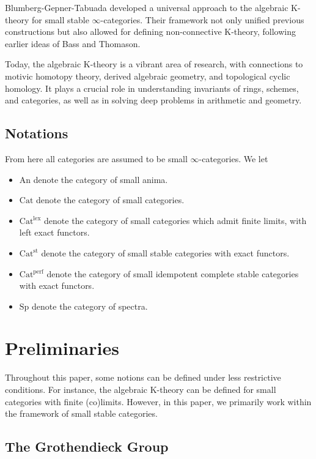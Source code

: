 \documentclass[a4paper,dvipdfmx,11pt,reqno]{amsart}
\newcommand{\An}{\mathrm{An}}
\newcommand{\Cat}{\mathrm{Cat}}
\newcommand{\Catlex}{\mathrm{Cat^{lex}}}
\newcommand{\Catperf}{\mathrm{Cat^{perf}}}
\newcommand{\Catst}{\mathrm{Cat^{st}}}
\newcommand{\Sp}{\mathrm{Sp}}
\theoremstyle{definition}
\begin{document}
Blumberg-Gepner-Tabuada developed a universal approach to the algebraic K-theory for small stable $\infty$-categories.
Their framework not only unified previous constructions but also allowed for defining non-connective K-theory, following earlier ideas of Bass and Thomason.

Today, the algebraic K-theory is a vibrant area of research, with connections to motivic homotopy theory, derived algebraic geometry, and topological cyclic homology. 
It plays a crucial role in understanding invariants of rings, schemes, and categories, as well as in solving deep problems in arithmetic and geometry.

\subsection{Notations}

From here all categories are assumed to be small $\infty$-categories.
We let 
\begin{itemize}
  \item $\An$ denote the category of small anima.
  \item $\Cat$ denote the category of small categories.
  \item $\Catlex$ denote the category of small categories which admit finite limits, with left exact functors.
  \item $\Catst$ denote the category of small stable categories with exact functors.
  \item $\Catperf$ denote the category of small idempotent complete stable categories with exact functors.
  \item $\Sp$ denote the category of spectra.
\end{itemize}


\section{Preliminaries} \label{sec.preliminaries}

Throughout this paper, some notions can be defined under less restrictive conditions.  
For instance, the algebraic K-theory can be defined for small categories with finite (co)limits.  
However, in this paper, we primarily work within the framework of small stable categories.

\subsection{The Grothendieck Group} 
\end{document}
